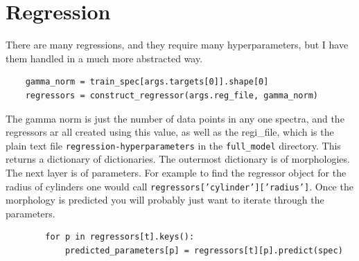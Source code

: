 \documentclass{article}
\begin{document}
\section{Regression}
There are many regressions, and they require many hyperparameters, but I have them handled in a much more abstracted way.
\begin{verbatim}
    gamma_norm = train_spec[args.targets[0]].shape[0]
    regressors = construct_regressor(args.reg_file, gamma_norm)
\end{verbatim}

The gamma norm is just the number of data points in any one spectra, and the regressors ar all created using this value, as well as the regi\_file, which is the plain text file \texttt{regression-hyperparameters} in the \texttt{full\_model} directory.
This returns a dictionary of dictionaries.
The outermost dictionary is of morphologies.
The next layer is of parameters.
For example to find the regressor object for the radius of cylinders one would call \texttt{regressors['cylinder']['radius']}.
Once the morphology is predicted you will probably just want to iterate through the parameters.
\begin{verbatim}
        for p in regressors[t].keys():
            predicted_parameters[p] = regressors[t][p].predict(spec)
\end{verbatim}
\end{document}
